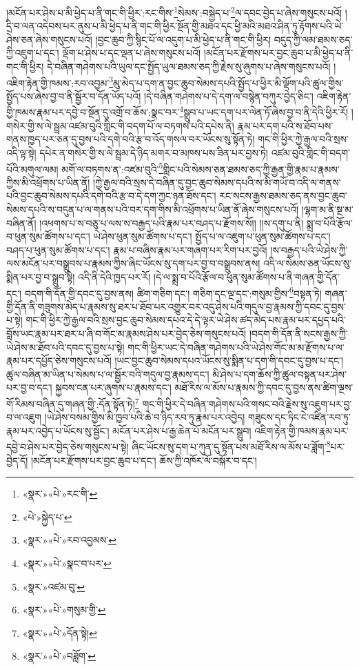 །མངོན་པར་ཤེས་པ་མི་ཕྱེད་པ་ནི་གང་གི་ཕྱིར་:རང་གིས་\footnote{«སྣར་»«པེ་»རང་གི་}སེམས་:བསྐྱེད་པ་\footnote{«པེ་»སྐྱེད་པ་}ལ་དབང་བྱེད་པ་ཞེས་གསུངས་པའོ། །དྲི་བ་ལན་འདེབས་པར་ནུས་པ་མི་ཕྱེད་པ་ནི་གང་གི་ཕྱིར་སྔོན་གྱི་མཐའ་དང་ཕྱི་མའི་མཐའ་ཤིན་ཏུ་རྟོགས་པའི་ཡེ་ཤེས་ཅན་ཞེས་གསུངས་པའོ། །བྱང་ཆུབ་ཀྱི་སྙིང་པོ་ལ་འདུག་པ་མི་ཕྱེད་པ་ནི་གང་གི་ཕྱིར། བདུད་ཀྱི་ལམ་ཐམས་ཅད་ཀྱི་འཇུག་པ་དང་། ལྡོག་པ་ཤེས་པ་དང་ལྡན་པ་ཞེས་གསུངས་པའོ། །མངོན་པར་རྫོགས་པར་བྱང་ཆུབ་པ་མི་ཕྱེད་པ་ནི་གང་གི་ཕྱིར། དེ་བཞིན་གཤེགས་པའི་ཡུལ་དང་སྤྱོད་ཡུལ་ཐམས་ཅད་ཀྱི་རྗེས་སུ་ཞུགས་པ་ཞེས་གསུངས་པའོ། །འཇིག་རྟེན་གྱི་ཁམས་:རབ་འབྱམ་\footnote{«སྣར་»«པེ་»རབ་འབྱམས་}མུ་མེད་པ་དག་ན་བྱང་ཆུབ་སེམས་དཔའི་སྤྱོད་པ་ཕྱིར་མི་ལྡོག་པའི་ཚུལ་གྱིས་སྤྱོད་པས་ཞེས་བྱ་བ་ནི་སྦྱོར་བ་དོན་ཡོད་པའོ། །དེ་བཞིན་གཤེགས་པ་དེ་དག་ལ་བསྙེན་བཀུར་བྱེད་ཅིང་། འཇིག་རྟེན་གྱི་ཁམས་རྣམ་པར་དབྱེ་བ་སྔོན་དུ་འགྲོ་བ་ཆོས་:སྣང་བར་\footnote{«སྣར་»«པེ་»སྣང་བ་པར་}སྒྲུབ་པ་ཡང་དག་པར་ལེན་ཏོ་ཞེས་བྱ་བ་ནི་དེའི་ཕྱིར་རོ། །གསེར་གྱི་ས་ལེ་སྦྲམ་འཛམ་བུའི་གླིང་གི་བདག་པོ་ལ་བཏགས་པའི་དཔེས་ནི། རྣམ་པར་དག་པའི་ས་ཐོབ་པས་གནས་ཁྱད་པར་ཅན་དུ་བྱས་པའི་དགེ་བའི་རྩ་བ་འོད་གསལ་བར་ཡོངས་སུ་སྟོན་ཏེ། གང་གི་ཕྱིར་ཀྱེ་རྒྱལ་བའི་སྲས་འདི་ལྟ་སྟེ། དཔེར་ན་གསེར་གྱི་ས་ལེ་སྦྲམ་དེ་ཉིད་མགར་བ་མཁས་པས་ཟིན་པར་བྱས་ཏེ། འཛམ་བུའི་གླིང་གི་བདག་པོའི་མགུལ་ལམ། མགོ་ལ་བཏགས་ན་:འཛམ་བུའི་\footnote{«སྣར་»འཛམ་བུ་}གླིང་པའི་སེམས་ཅན་ཐམས་ཅད་ཀྱི་རྒྱན་གྱི་རྣམ་པ་རྣམས་ཀྱིས་མི་འཕྲོགས་པ་ཡིན་ནོ། །ཀྱེ་རྒྱལ་བའི་སྲས་དེ་བཞིན་དུ་བྱང་ཆུབ་སེམས་དཔའི་ས་མི་གཡོ་བ་འདི་ལ་གནས་པའི་བྱང་ཆུབ་སེམས་དཔའི་དགེ་བའི་རྩ་བ་དེ་དག་ཀྱང་ཉན་ཐོས་དང་། རང་སངས་རྒྱས་ཐམས་ཅད་ནས་བྱང་ཆུབ་སེམས་དཔའི་ས་བདུན་པ་ལ་གནས་པའི་བར་དག་གིས་མི་འཕྲོགས་པ་ཡིན་ནོ་ཞེས་གསུངས་པའོ། །ལྷག་མ་ནི་སྔ་མ་བཞིན་ནོ། །འཕགས་པ་ས་བཅུ་པ་ལས་ས་བརྒྱད་པའི་རྣམ་པར་བཤད་པ་རྫོགས་སོ།། །།ས་དགུ་པ་ནི། སྨྲ་བ་པོའི་རྩོལ་བ་ཕུན་སུམ་ཚོགས་པ་དང་། ཡེ་ཤེས་ཕུན་སུམ་ཚོགས་པ་དང་། སྤྱོད་པ་ལ་འཇུག་པ་ཕུན་སུམ་ཚོགས་པ་དང་། བཤད་པ་ཕུན་སུམ་ཚོགས་པ་དང་། རྣམ་པ་བཞིས་རྣམ་པར་གཞག་པར་རིག་པར་བྱའོ། །ས་བརྒྱད་པའི་ཡེ་ཤེས་ཀྱི་ལས་མངོན་པར་བསྒྲུབས་པ་རྣམས་ཀྱིས་ཞིང་ཡོངས་སུ་དག་པར་བྱ་བ་བསྒྲུབས་ནས། འདི་ལ་སེམས་ཅན་ཡོངས་སུ་སྨིན་པར་བྱ་བ་སྒྲུབ་སྟེ། འདི་ནི་དེའི་ཁྱད་པར་རོ། །དེ་ལ་སྨྲ་བ་པོའི་རྩོལ་བ་ཕུན་སུམ་ཚོགས་པ་ནི་གཞན་གྱི་དོན་དང་། བདག་གི་དོན་གྱི་དབང་དུ་བྱས་ནས། ཚིག་གཅིག་དང་། གཅིག་དང་ལྔ་དང་:གསུམ་གྱིས་\footnote{«སྣར་»«པེ་»གསུམ་གྱི་}བསྟན་ཏེ། གཞན་གྱི་དོན་ནི་གཟུགས་མེད་པ་རྣམས་སུ་ཐར་པ་ཐོབ་པར་འགྱུར་བར་འདུ་ཤེས་པའི་གདུལ་བྱ་རྣམས་ཀྱི་དབང་དུ་བྱས་པ་སྟེ། གང་གི་ཕྱིར་ཀྱེ་རྒྱལ་བའི་སྲས་བྱང་ཆུབ་སེམས་དཔའ་དེ་དེ་ལྟར་ཡེ་ཤེས་ཚད་མེད་པས་རྣམ་པར་དཔྱད་པའི་བློས་ཡང་རྣམ་པར་ཐར་པ་ཞི་བ་གོང་མ་རྣམས་ཤེས་པར་བྱེད་ཅེས་གསུངས་པའོ། །བདག་གི་དོན་ནི་སངས་རྒྱས་ཀྱི་ཡེ་ཤེས་མ་ཐོབ་པའི་དབང་དུ་བྱས་པ་སྟེ། གང་གི་ཕྱིར་ཡང་དེ་བཞིན་གཤེགས་པའི་ཡེ་ཤེས་གོང་མ་མ་རྫོགས་པ་ལ་རྣམ་པར་དཔྱོད་ཅེས་གསུངས་པའོ། །ཡང་བྱང་ཆུབ་སེམས་དཔའ་ཡོངས་སུ་སྨིན་པ་དག་གི་དབང་དུ་བྱས་པ་དང་། ཚུལ་བཞིན་མ་ཡིན་པ་སེམས་པ་ལ་སྦྱོར་བའི་གདུལ་བྱ་རྣམས་དང་། མི་ཤེས་པ་དག་ཆོས་ཀྱི་ཚུལ་བསྟན་པར་ཤེས་པར་བྱ་བ་དང་། སྐྱབས་ངན་པར་ཞུགས་པ་རྣམས་དང་། མཐོ་རིས་ལ་མོས་པ་རྣམས་ཀྱི་དབང་དུ་བྱས་ནས་ཚིག་ལྔས་གོ་རིམས་བཞིན་དུ་གཞན་གྱི་:དོན་སྟོན་ཏེ།\footnote{«སྣར་»«པེ་»དོན་སྟེ།} གང་གི་ཕྱིར་དེ་བཞིན་གཤེགས་པའི་གསང་བའི་རྗེས་སུ་འཇུག་པར་བྱ་བ་ལ་འཇུག །ཡེ་ཤེས་བསམ་གྱིས་མི་ཁྱབ་པའི་ཆེ་བ་ཉིད་རབ་ཏུ་རྣམ་པར་འབྱེད། གཟུངས་དང་ཏིང་ངེ་འཛིན་རབ་ཏུ་རྣམ་པར་འབྱེད་པ་ཡོངས་སུ་སྦྱོང་། མངོན་པར་ཤེས་པ་རྒྱ་ཆེན་པོ་མངོན་པར་སྒྲུབ། འཇིག་རྟེན་གྱི་ཁམས་རྣམ་པར་དབྱེ་བ་ཤེས་པར་བྱེད་ཅེས་གསུངས་པ་སྟེ། ཞིང་ཡོངས་སུ་དག་པ་ཀུན་དུ་སྟོན་པས་མཐོ་རིས་ལ་མོས་པ་ཟློག་\footnote{«སྣར་»«པེ་»བཟློག་}པར་བྱེད་དོ། །མངོན་པར་རྫོགས་པར་བྱང་ཆུབ་པ་དང་། ཆོས་ཀྱི་འཁོར་ལོ་བསྐོར་བ་དང་། 